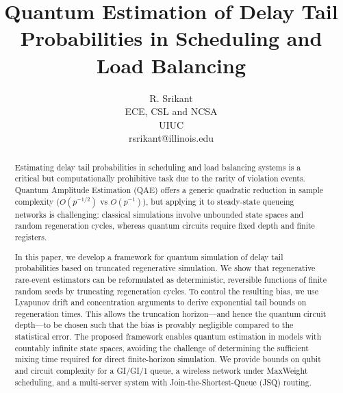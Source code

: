 \documentclass[11pt]{article}
\begin{document}
\title{Quantum Estimation of Delay Tail Probabilities in Scheduling and Load Balancing}

\author{R. Srikant\\ECE, CSL and NCSA\\UIUC\\
rsrikant@illinois.edu}

\maketitle



\begin{abstract}
Estimating delay tail probabilities in scheduling and load balancing systems is a critical but computationally prohibitive task due to the rarity of violation events. Quantum Amplitude Estimation (QAE) offers a generic quadratic reduction in sample complexity ($O(p^{-1/2})$ vs $O(p^{-1})$), but applying it to steady-state queueing networks is challenging: classical simulations involve unbounded state spaces and random regeneration cycles, whereas quantum circuits require fixed depth and finite registers.

In this paper, we develop a framework for quantum simulation of delay tail probabilities based on truncated regenerative simulation. We show that regenerative rare-event estimators can be reformulated as deterministic, reversible functions of finite random seeds by truncating regeneration cycles. To control the resulting bias, we use Lyapunov drift and concentration arguments to derive exponential tail bounds on regeneration times. This allows the truncation horizon—and hence the quantum circuit depth—to be chosen such that the bias is provably negligible compared to the statistical error. The proposed framework enables quantum estimation in models with countably infinite state spaces, avoiding the challenge of determining the sufficient mixing time required for direct finite-horizon simulation. We provide bounds on qubit and circuit complexity for a GI/GI/1 queue, a wireless network under MaxWeight scheduling, and a multi-server system with Join-the-Shortest-Queue (JSQ) routing.
\end{abstract}



\maketitle
\end{document}
